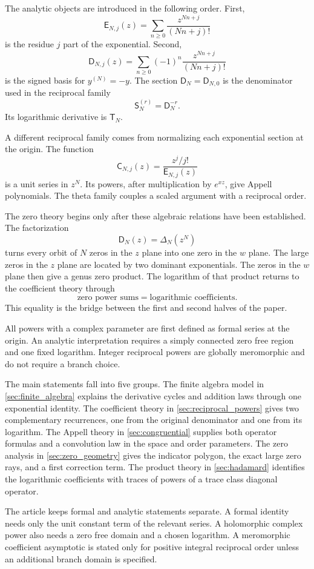 \documentclass{aomart}
\theoremstyle{definition}
\theoremstyle{remark}
\newcommand{\Dfun}{\mathsf D}
\newcommand{\Efun}{\mathsf E}
\newcommand{\Sfun}{\mathsf S}
\newcommand{\Tfun}{\mathsf T}
\newcommand{\Cfun}{\mathsf C}
\begin{document}
The analytic objects are introduced in the following order.  First,
\[
\Efun_{N,j}(z)
=
\sum_{n\geq0}\frac{z^{Nn+j}}{(Nn+j)!}
\]
is the residue $j$ part of the exponential.  Second,
\[
\Dfun_{N,j}(z)
=
\sum_{n\geq0}(-1)^n\frac{z^{Nn+j}}{(Nn+j)!}
\]
is the signed basis for $y^{(N)}=-y$.  The section $\Dfun_N=\Dfun_{N,0}$ is the denominator used in the reciprocal family
\[
\Sfun_N^{(r)}=\Dfun_N^{-r}.
\]
Its logarithmic derivative is $\Tfun_N$.

A different reciprocal family comes from normalizing each exponential section at the origin.  The function
\[
\Cfun_{N,j}(z)
=
\frac{z^j/j!}{\Efun_{N,j}(z)}
\]
is a unit series in $z^N$.  Its powers, after multiplication by $e^{xz}$, give Appell polynomials.  The theta family couples a scaled argument with a reciprocal order.

The zero theory begins only after these algebraic relations have been established.  The factorization
\[
\Dfun_N(z)=\Delta_N(z^N)
\]
turns every orbit of $N$ zeros in the $z$ plane into one zero in the $w$ plane.  The large zeros in the $z$ plane are located by two dominant exponentials.  The zeros in the $w$ plane then give a genus zero product.  The logarithm of that product returns to the coefficient theory through
\[
\text{zero power sums}
=
\text{logarithmic coefficients}.
\]
This equality is the bridge between the first and second halves of the paper.

All powers with a complex parameter are first defined as formal series at the origin.  An analytic interpretation requires a simply connected zero free region and one fixed logarithm.  Integer reciprocal powers are globally meromorphic and do not require a branch choice.

The main statements fall into five groups.  The finite algebra model in \cref{sec:finite_algebra} explains the derivative cycles and addition laws through one exponential identity.  The coefficient theory in \cref{sec:reciprocal_powers} gives two complementary recurrences, one from the original denominator and one from its logarithm.  The Appell theory in \cref{sec:congruential} supplies both operator formulas and a convolution law in the space and order parameters.  The zero analysis in \cref{sec:zero_geometry} gives the indicator polygon, the exact large zero rays, and a first correction term.  The product theory in \cref{sec:hadamard} identifies the logarithmic coefficients with traces of powers of a trace class diagonal operator.

The article keeps formal and analytic statements separate.  A formal identity needs only the unit constant term of the relevant series.  A holomorphic complex power also needs a zero free domain and a chosen logarithm.  A meromorphic coefficient asymptotic is stated only for positive integral reciprocal order unless an additional branch domain is specified.
\end{document}
